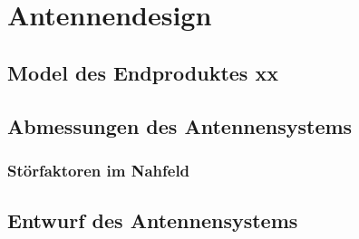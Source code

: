 \section{Antennendesign}
\subsection{Model des Endproduktes xx}
\subsection{Abmessungen des Antennensystems}
\subsubsection{Störfaktoren im Nahfeld}
\subsection{Entwurf des Antennensystems}
